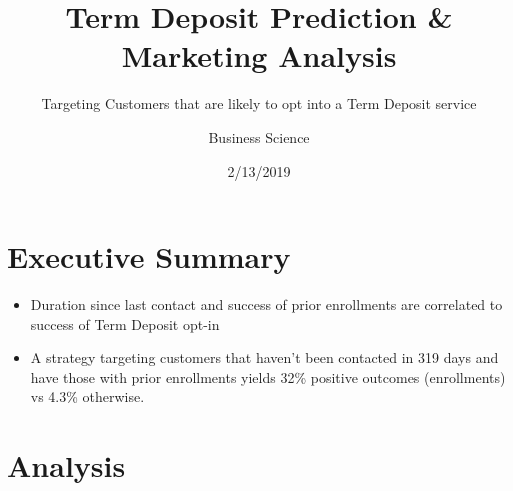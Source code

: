 \documentclass[
]{article}
\title{Term Deposit Prediction \& Marketing Analysis}
\subtitle{Targeting Customers that are likely to opt into a Term Deposit service}
\author{Business Science}
\date{2/13/2019}
\providecommand{\tightlist}{%
  \setlength{\itemsep}{0pt}\setlength{\parskip}{0pt}}
\begin{document}
\maketitle

\hypertarget{executive-summary}{%
\section{Executive Summary}\label{executive-summary}}

\begin{itemize}
\tightlist
\item
  Duration since last contact and success of prior enrollments are
  correlated to success of Term Deposit opt-in
\item
  A strategy targeting customers that haven't been contacted in 319 days
  and have those with prior enrollments yields 32\% positive outcomes
  (enrollments) vs 4.3\% otherwise.
\end{itemize}

\hypertarget{analysis}{%
\section{Analysis}\label{analysis}}
\end{document}
